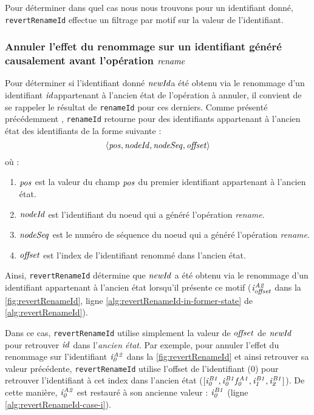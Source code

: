 Pour déterminer dans quel cas nous nous trouvons pour un identifiant donné, \texttt{revertRenameId} effectue un filtrage par motif sur la valeur de l'identifiant.

\subsubsection{Annuler l'effet du renommage sur un identifiant généré causalement avant l'opération $\mathit{rename}$}

Pour déterminer si l'identifiant donné $\mathit{newId}$\footnotemark a été obtenu via le renommage d'un identifiant $\mathit{id}$\footnotemark[\value{footnote}] appartenant à l'ancien état de l'opération à annuler, il convient de se rappeler le résultat de \texttt{renameId} pour ces derniers.
Comme présenté précédemment , \texttt{renameId} retourne pour des identifiants appartenant à l'ancien état des identifiants de la forme suivante :
\[ \langle \mathit{pos},\mathit{nodeId},\mathit{nodeSeq},\mathit{offset} \rangle \]
où :
\begin{enumerate}
    \item $\mathit{pos}$ est la valeur du champ $\mathit{pos}$ du premier identifiant appartenant à l'ancien état.
    \item $\mathit{nodeId}$ est l'identifiant du noeud qui a généré l'opération \emph{rename}.
    \item $\mathit{nodeSeq}$ est le numéro de séquence du noeud qui a généré l'opération \emph{rename}.
    \item $\mathit{offset}$ est l'index de l'identifiant renommé dans l'ancien état.
\end{enumerate}
Ainsi, \texttt{revertRenameId} détermine que $\mathit{newId}$ a été obtenu via le renommage d'un identifiant appartenant à l'ancien état lorsqu'il présente ce motif ($\mathit{i}^{\mathit{A2}}_{\mathit{offset}}$ dans la \autoref{fig:revertRenameId}, ligne \ref{alg:revertRenameId-in-former-state} de \autoref{alg:revertRenameId}).

Dans ce cas, \texttt{revertRenameId} utilise simplement la valeur de $\mathit{offset}$ de $\mathit{newId}$ pour retrouver $\mathit{id}$ dans l'\emph{ancien état}.
Par exemple, pour annuler l'effet du renommage sur l'identifiant $\mathit{i}^{\mathit{A2}}_{\mathit{0}}$ dans la \autoref{fig:revertRenameId} et ainsi retrouver sa valeur précédente, \texttt{revertRenameId} utilise l'offset de l'identifiant (0) pour retrouver l'identifiant à cet index dans l'ancien état ($[\mathit{i}^{\mathit{B1}}_{\mathit{0}},\mathit{i}^{\mathit{B1}}_{\mathit{0}}\mathit{f}^{\mathit{A1}}_{\mathit{0}},\mathit{i}^{\mathit{B1}}_{\mathit{1}},\mathit{i}^{\mathit{B1}}_{\mathit{2}}]$).
De cette manière, $\mathit{i}^{\mathit{A2}}_{\mathit{0}}$ est restauré à son ancienne valeur : $\mathit{i}^{\mathit{B1}}_{\mathit{0}}$ (ligne \ref{alg:revertRenameId-case-i}).

